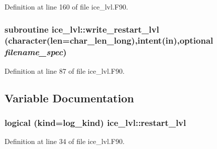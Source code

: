 Definition at line 160 of file ice\_\-lvl.F90.\hypertarget{namespaceice__lvl_adee9ebc38f9bb2b4317bd8d3660f2976}{
\subsubsection[{write\_\-restart\_\-lvl}]{\setlength{\rightskip}{0pt plus 5cm}subroutine ice\_\-lvl::write\_\-restart\_\-lvl (character(len=char\_\-len\_\-long),intent(in),optional {\em filename\_\-spec})}}
\label{namespaceice__lvl_adee9ebc38f9bb2b4317bd8d3660f2976}


Definition at line 87 of file ice\_\-lvl.F90.

\subsection{Variable Documentation}
\hypertarget{namespaceice__lvl_a889f31c602d28473918e09b006ae7e0f}{
\subsubsection[{restart\_\-lvl}]{\setlength{\rightskip}{0pt plus 5cm}logical (kind=log\_\-kind) {\bf ice\_\-lvl::restart\_\-lvl}}}
\label{namespaceice__lvl_a889f31c602d28473918e09b006ae7e0f}


Definition at line 34 of file ice\_\-lvl.F90.